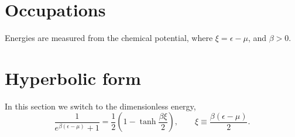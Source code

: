 \documentclass{article}
\begin{document}
\section{Occupations}
Energies are measured from the chemical potential, where $\xi = \epsilon - \mu$, and $\beta>0$.
\section{Hyperbolic form}
In this section we switch to the dimensionless energy,
\begin{equation}
\frac{1}{e^{\beta(\epsilon-\mu)}+1} = \frac{1}{2}\left(1-\tanh\frac{\beta\xi}{2}\right), \qquad \xi \equiv \frac{\beta(\epsilon-\mu)}{2} .
\label{eq:tanh}
\end{equation}
\end{document}
